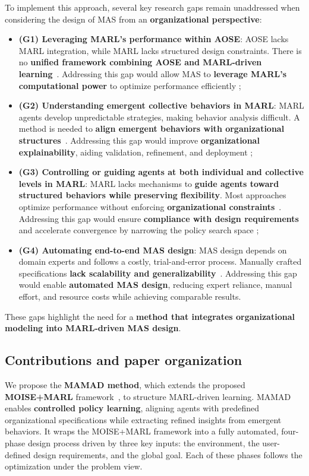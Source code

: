 \documentclass[pdflatex,sn-mathphys-num]{sn-jnl}%
\theoremstyle{thmstyleone}%
\theoremstyle{thmstyletwo}%
\theoremstyle{thmstylethree}%
\begin{document}
To implement this approach, several key research gaps remain unaddressed when considering the design of MAS from an \textbf{organizational perspective}:
%
\begin{itemize}
  \item \textbf{(G1) Leveraging MARL's performance within AOSE}: AOSE lacks MARL integration, while MARL lacks structured design constraints. There is no \textbf{unified framework combining AOSE and MARL-driven learning}~\cite{Cossentino2014}. Addressing this gap would allow MAS to \textbf{leverage MARL's computational power} to optimize performance efficiently ;
  
  \item \textbf{(G2) Understanding emergent collective behaviors in MARL}: MARL agents develop unpredictable strategies, making behavior analysis difficult. A method is needed to \textbf{align emergent behaviors with organizational structures}~\cite{Du2022, Papoudakis2021}. Addressing this gap would improve \textbf{organizational explainability}, aiding validation, refinement, and deployment ;
  
  \item \textbf{(G3) Controlling or guiding agents at both individual and collective levels in MARL}: MARL lacks mechanisms to \textbf{guide agents toward structured behaviors while preserving flexibility}. Most approaches optimize performance without enforcing \textbf{organizational constraints}~\cite{Oroojlooy2023}. Addressing this gap would ensure \textbf{compliance with design requirements} and accelerate convergence by narrowing the policy search space ;
  
  \item \textbf{(G4) Automating end-to-end MAS design}: MAS design depends on domain experts and follows a costly, trial-and-error process. Manually crafted specifications \textbf{lack scalability and generalizability}~\cite{Nguyen2020}. Addressing this gap would enable \textbf{automated MAS design}, reducing expert reliance, manual effort, and resource costs while achieving comparable results.
\end{itemize}
%
These gaps highlight the need for a \textbf{method that integrates organizational modeling into MARL-driven MAS design}.


\subsection{Contributions and paper organization}

We propose the \textbf{MAMAD method}, which extends the proposed \textbf{MOISE+MARL} framework~\cite{soule2025moisemarl}, to structure MARL-driven learning. MAMAD enables \textbf{controlled policy learning}, aligning agents with predefined organizational specifications while extracting refined insights from emergent behaviors. It wraps the MOISE+MARL framework into a fully automated, four-phase design process driven by three key inputs: the environment, the user-defined design requirements, and the global goal. Each of these phases follows the optimization under the problem view.
\end{document}
